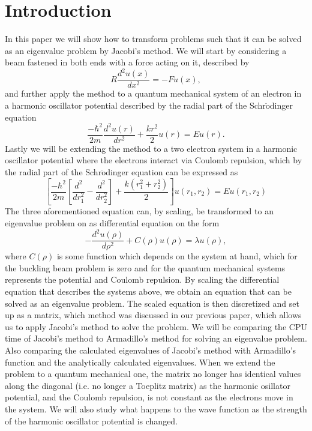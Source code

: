 \documentclass{emulateapj}
\begin{document}
\section{Introduction}
\label{sec:introduction}
In this paper we will show how to transform problems such that it can be solved as an eigenvalue problem by Jacobi's method. We will start by considering a beam fastened in both ends with a force acting on it, described by
%
\begin{equation*}
    R\frac{d^2u(x)}{dx^2} = -Fu(x),
\end{equation*}
%
and further apply the method to a quantum mechanical system of an electron in a harmonic oscillator potential described by the radial part of the Schr$\ddot{\mathrm{o}}$dinger equation 
%
\begin{equation*}
    \frac{-\hbar^2}{2m}\frac{d^2u(r)}{dr^2} + \frac{kr^2}{2}u(r) = Eu(r).
\end{equation*}
%
Lastly we will be extending the method to a two electron system in a harmonic oscillator potential where the electrons interact via Coulomb repulsion, which by the radial part of the Schr$\ddot{\mathrm{o}}$dinger equation can be expressed as
%
\begin{equation*}
    \left[\frac{-\hbar^2}{2m}\left[\frac{d^2}{dr_1^2} - \frac{d^2}{dr_2^2}\right] + \frac{k(r_1^2 + r_2^2)}{2}\right]u(r_1,r_2) = Eu(r_1,r_2)
\end{equation*}
%
The three aforementioned equation can, by scaling, be transformed to an eigenvalue problem on as differential equation on the form
%
\begin{equation*}
    -\frac{d^2u(\rho)}{d\rho^2} + C(\rho)u(\rho) = \lambda u(\rho),
\end{equation*}
%
where $C(\rho)$ is some function which depends on the system at hand, which for the buckling beam problem is zero and for the quantum mechanical systems represents the potential and Coulomb repulsion. By scaling the differential equation that describes the systems above, we obtain an equation that can be solved as an eigenvalue problem. The scaled equation is then discretized and set up as a matrix, which method  was discussed in our previous paper, which allows us to apply Jacobi's method to solve the problem. We will be comparing the CPU time of Jacobi's method to Armadillo's method for solving an eigenvalue problem. Also comparing the calculated eigenvalues of Jacobi's method with Armadillo's function and the analytically calculated eigenvalues. When we extend the problem to a quantum mechanical one, the matrix no longer has identical values along the diagonal (i.e. no longer a Toeplitz matrix) as the harmonic osillator potential, and the Coulomb repulsion, is not constant as the electrons move in the system. We will also study what happens to the wave function as the strength of the harmonic oscillator potential is changed. 
\end{document}
